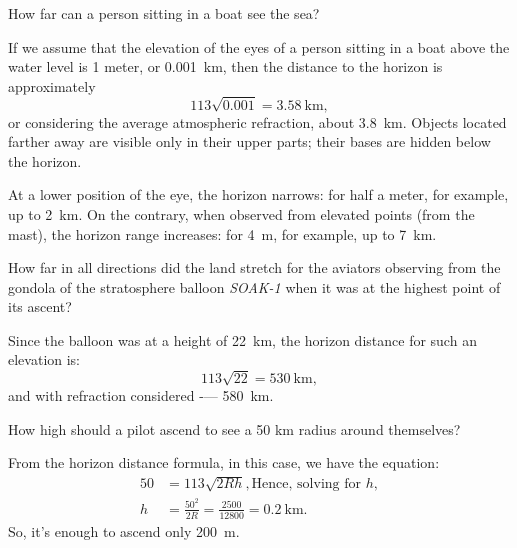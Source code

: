 \ques How far can a person sitting in a boat see the sea?

\ans If we assume that the elevation of the eyes of a person sitting in a boat above the water level is 1 meter, or \SI{0.001}{\kilo\meter}, then the distance to the horizon is approximately 
\begin{equation*}%
113 \sqrt{0.001} = \SI{3.58}{\kilo\meter},
\end{equation*} 
or considering the average atmospheric refraction, about \SI{3.8}{\kilo\meter}. Objects located farther away are visible only in their upper parts; their bases are hidden below the horizon.

At a lower position of the eye, the horizon narrows: for half a meter, for example, up to \SI{2}{\kilo\meter}. On the contrary, when observed from elevated points (from the mast), the horizon range increases: for \SI{4}{\meter}, for example, up to \SI{7}{\kilo\meter}.

\ques How far in all directions did the land stretch for the aviators observing from the gondola of the stratosphere balloon \emph{SOAK-1} when it was at the highest point of its ascent?

\ans Since the balloon was at a height of \SI{22}{\kilo\meter}, the horizon distance for such an elevation is:
\begin{equation*}%
113 \sqrt{22} = \SI{530}{\kilo\meter},
\end{equation*}
and with refraction considered -— \SI{580}{\kilo\meter}.

\ques How high should a pilot ascend to see a 50 km radius around themselves?

\ans From the horizon distance formula, in this case, we have the equation:
\begin{align*}%
50 & = 113 \sqrt{2Rh}, \text{Hence, solving for} \,\,h,\\
h & = \frac{50^{2}}{2R} = \frac{2500}{12800} = \SI{0.2}{\kilo\meter}.
\end{align*}
So, it's enough to ascend only \SI{200}{\meter}.

